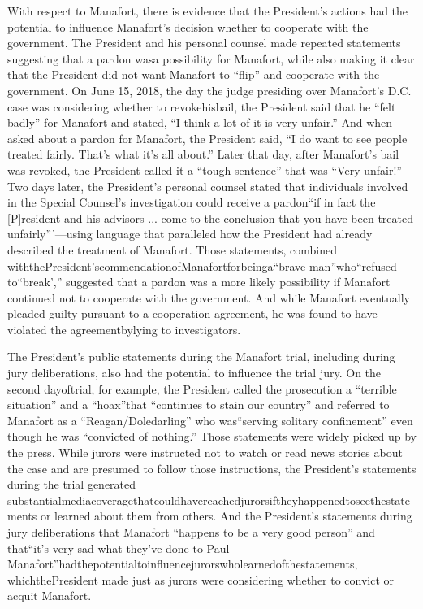 With respect to Manafort, there is evidence that the President's actions had the potential to influence Manafort's decision whether to cooperate with the government.
The President and his personal counsel made repeated statements suggesting that a pardon wasa possibility for Manafort, while also making it clear that the President did not want Manafort to “flip” and cooperate with the government.
On June 15, 2018, the day the judge presiding over Manafort's D.C. case was considering whether to revokehisbail, the President said that he “felt badly” for Manafort and stated, “I think a lot of it is very unfair.”
And when asked about a pardon for Manafort, the President said, “I do want to see people treated fairly.
That's what it's all about.” Later that day, after Manafort's bail was revoked, the President called it a “tough sentence” that was “Very unfair!”
Two days later, the President's personal counsel stated that individuals involved in the Special Counsel's investigation could receive a pardon“if in fact the [P]resident and his advisors ... come to the conclusion that you have been treated unfairly”'—using language that paralleled how the President had already described the treatment of Manafort.
Those statements, combined withthePresident'scommendationofManafortforbeinga“brave man”who“refused to“break',” suggested that a pardon was a more likely possibility if Manafort continued not to cooperate with the government.
And while Manafort eventually pleaded guilty pursuant to a cooperation agreement, he was found to have violated the agreementbylying to investigators.

The President's public statements during the Manafort trial, including during jury deliberations, also had the potential to influence the trial jury.
On the second dayoftrial, for example, the President called the prosecution a “terrible situation” and a “hoax”that “continues to stain our country” and referred to Manafort as a “Reagan/Doledarling” who was“serving solitary confinement” even though he was “convicted of nothing.”
Those statements were widely picked up by the press.
While jurors were instructed not to watch or read news stories about the case and are presumed to follow those instructions, the President's statements during the trial generated substantialmediacoveragethatcouldhavereachedjurorsiftheyhappenedtoseethestatements or learned about them from others.
And the President's statements during jury deliberations that Manafort “happens to be a very good person” and that“it's very sad what they've done to Paul Manafort”hadthepotentialtoinfluencejurorswholearnedofthestatements, whichthePresident made just as jurors were considering whether to convict or acquit Manafort.

